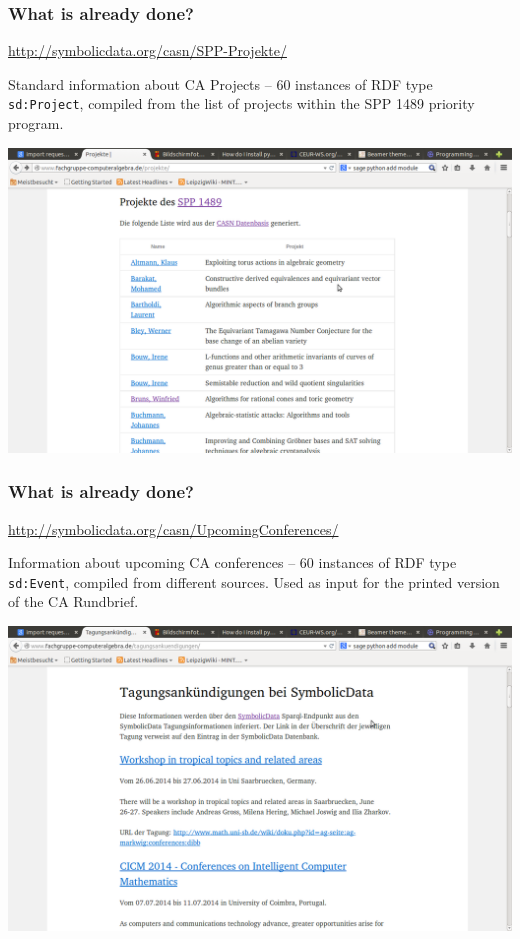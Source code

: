 \documentclass{beamer}
\begin{document}
\begin{frame}\frametitle{What is already done?}\small

  \begin{center}
    \url{http://symbolicdata.org/casn/SPP-Projekte/}
  \end{center}

Standard information about CA Projects -- 60 instances of RDF type
\texttt{sd:Project}, compiled from the list of projects within the SPP 1489
priority program.

\begin{center}
  \includegraphics[width=.8\textwidth]{cicm-14/Projekte.png}
\end{center}
\end{frame}

\begin{frame}\frametitle{What is already done?}\small

  \begin{center}
    \url{http://symbolicdata.org/casn/UpcomingConferences/}
  \end{center}

Information about upcoming CA conferences -- 60 instances of RDF type
\texttt{sd:Event}, compiled from different sources.  Used as input for the
printed version of the CA Rundbrief.

\begin{center}
  \includegraphics[width=.8\textwidth]{cicm-14/ConferenceAnnouncements.png}
\end{center}
\end{frame}
\end{document}

